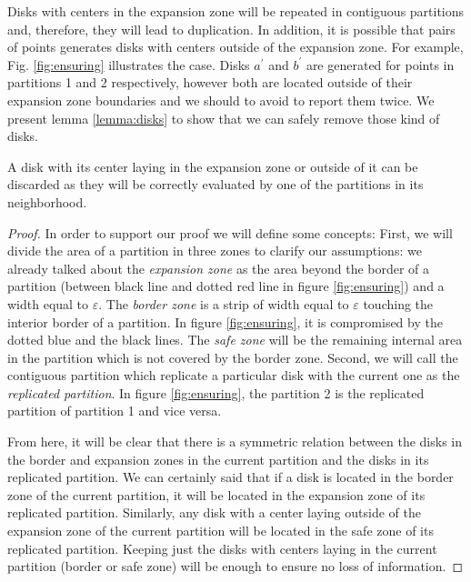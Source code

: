 \begin{itemize}
Disks with centers in the expansion zone will be repeated in contiguous partitions and, therefore, they will lead to duplication.  In addition, it is possible that pairs of points generates disks with centers outside of the expansion zone.  For example, Fig. \ref{fig:ensuring} illustrates the case.  Disks $a^\prime$ and $b^\prime$ are generated for points in partitions 1 and 2 respectively, however both are located outside of their expansion zone boundaries and we should to avoid to report them twice.  We present lemma \ref{lemma:disks} to show that we can safely remove those kind of disks.

\begin{lemma}\label{lemma:disks}
A disk with its center laying in the expansion zone or outside of it can be discarded as they will be correctly evaluated by one of the partitions in its neighborhood. 
\end{lemma}

\begin{proof}
  In order to support our proof we will define some concepts:  First, we will divide the area of a partition in three zones to clarify our assumptions:  we already talked about the \textit{expansion zone} as the area beyond the border of a partition (between black line and dotted red line in figure \ref{fig:ensuring}) and a width equal to $\varepsilon$.  The \textit{border zone} is a strip of width equal to $\varepsilon$ touching the interior border of a partition.  In figure \ref{fig:ensuring}, it is compromised by the dotted blue and the black lines.  The \textit{safe zone} will be the remaining internal area in the partition which is not covered by the border zone.  Second, we will call the contiguous partition which replicate a particular disk with the current one as the \textit{replicated partition}. In figure \ref{fig:ensuring}, the partition 2 is the replicated partition of partition 1 and vice versa.

  From here, it will be clear that there is a symmetric relation between the disks in the border and expansion zones in the current partition and the disks in its replicated partition.  We can certainly said that if a disk is located in the border zone of the current partition, it will be located in the expansion zone of its replicated partition.  Similarly, any disk with a center laying outside of the expansion zone of the current partition will be located in the safe zone of its replicated partition.  Keeping just the disks with centers laying in the current partition (border or safe zone) will be enough to ensure no loss of information.
\end{proof}


\end{itemize}
